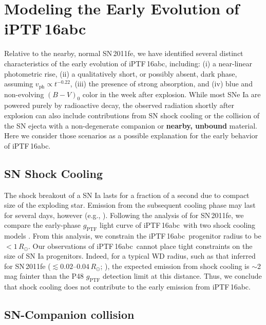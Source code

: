 \documentclass[twocolumn]{aastex61}
\newcommand{\sr}{R_\odot}
\newcommand{\abc}{iPTF\,16abc}
\begin{document}
\section{\textbf{Modeling the Early Evolution of \abc}} \label{sec:lc_energy}

Relative to the nearby, normal SN\,2011fe, we have identified several distinct
characteristics of the early evolution of \abc, including: (i) a near-linear
photometric rise, (ii) a qualitatively short, or possibly absent, dark phase,
assuming $v_\mathrm{ph} \propto t^{-0.22}$, (iii) the presence of strong
 absorption, and (iv) blue and non-evolving $(B - V)_0$ color in the
week after explosion. While most SNe Ia are powered purely by radioactive
decay, the observed radiation shortly after explosion can also include
contributions from SN shock cooling or the collision of the SN ejecta with a
non-degenerate companion or \textbf{nearby, unbound} material. Here we
consider those scenarios as a possible explanation for the early behavior of
\abc.

\subsection{SN Shock Cooling}

The shock breakout of a SN Ia lasts for a fraction of a second due to
compact size of the exploding star. Emission from the subsequent 
cooling phase may last for several days, however (e.g., 
\citealt{2010ApJ...708..598P}). Following the analysis of \citet{2012ApJ...744L..17B} for SN\,2011fe, we
compare the early-phase $g_\mathrm{PTF}$ light curve of \abc\ with
two shock cooling models \citep{2011ApJ...728...63R, 
2010ApJ...708..598P}. From this analysis, we constrain the \abc\ 
progenitor radius to be $<1\,\sr$. Our observations of \abc\ cannot 
place tight constraints on the size of SN Ia progenitors. Indeed, 
for a typical WD radius, such as that inferred for SN\,2011fe 
($\lesssim 0.02$--$0.04\,\sr$; \citealt{2012ApJ...744L..17B, 
2014ApJ...784...85P}), the expected emission from shock cooling is 
$\sim$2 mag fainter than the P48 $g_\mathrm{PTF}$ detection limit at this distance. 
Thus, we conclude that shock cooling does not contribute to the 
early emission from \abc.

\subsection{SN-Companion collision}
\label{sec:companion}
\end{document}

